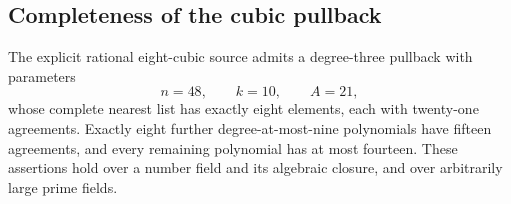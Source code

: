 \subsection{Completeness of the cubic pullback}
\label{app:cubic-pullback-completeness}

\begin{proposition}
\label{prop:cubic-pullback-completeness}
The explicit rational eight-cubic source admits a degree-three pullback with parameters
\[
 n=48,\qquad k=10,\qquad A=21,
\]
whose complete nearest list has exactly eight elements, each with twenty-one agreements. Exactly eight further degree-at-most-nine polynomials have fifteen agreements, and every remaining polynomial has at most fourteen. These assertions hold over a number field and its algebraic closure, and over arbitrarily large prime fields.
\end{proposition}

